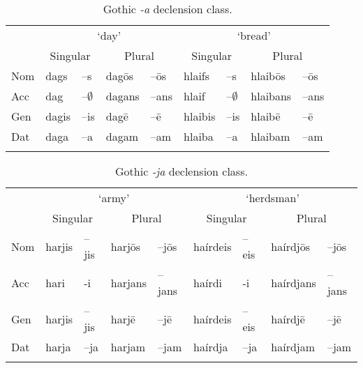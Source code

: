 \begin{table}[!htbp]
    \centering
    \caption{Gothic \textit{-a} declension class.}\label{tab:a-class-gothic}
    \begin{tabular}{lllllllll}
      \lsptoprule
      & \multicolumn{4}{c}{`day'} & \multicolumn{4}{c}{`bread'}\\
      & \multicolumn{2}{c}{Singular} & \multicolumn{2}{c}{Plural} & \multicolumn{2}{c}{Singular} & \multicolumn{2}{c}{Plural} \\
      \midrule

      Nom & dags  & –s           & dagōs  & –ōs  & hlaifs  & –s           & hlaibōs  & –ōs  \\
      Acc & dag   & –$\emptyset$ & dagans & –ans & hlaif   & –$\emptyset$ & hlaibans & –ans \\
      Gen & dagis & –is          & dagē   & –ē   & hlaibis & –is          & hlaibē   & –ē   \\
      Dat & daga  & –a           & dagam  & –am  & hlaiba  & –a           & hlaibam  & –am  \\
      \lspbottomrule
  \end{tabular}
\end{table}

\begin{table}[!htbp]
    \centering
      \caption{Gothic \textit{-ja} declension class.}\label{tab:ja-class-gothic}
  \begin{tabular}{lllllllll}
    \lsptoprule
    & \multicolumn{4}{c}{`army'} & \multicolumn{4}{c}{`herdsman'} \\
    & \multicolumn{2}{c}{Singular} & \multicolumn{2}{c}{Plural}   & \multicolumn{2}{c}{Singular} & \multicolumn{2}{c}{Plural} \\

    \midrule
    Nom & harjis & –jis & harjōs  & –jōs  & haírdeis & –eis & haírdjōs  & –jōs  \\
    Acc & hari   & -i   & harjans & –jans & haírdi   & -i   & haírdjans & –jans \\
    Gen & harjis & –jis & harjē   & –jē   & haírdeis & –eis & haírdjē   & –jē   \\
    Dat & harja  & –ja  & harjam  & –jam  & haírdja  & –ja  & haírdjam  & –jam  \\
    \lspbottomrule
  \end{tabular}
\end{table}

